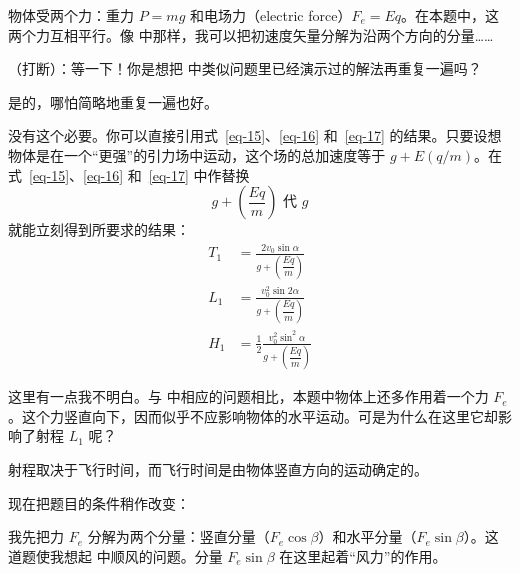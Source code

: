 \begin{dialogue}
\stdb 物体受两个力：重力 $P=mg$ 和电场力（electric force）$F_{e}=Eq$。在本题中，这两个力互相平行。像 中那样，我可以把初速度矢量分解为沿两个方向的分量……

\tchr （打断）：等一下！你是想把 中类似问题里已经演示过的解法再重复一遍吗？

\stdb 是的，哪怕简略地重复一遍也好。

\tchr 没有这个必要。你可以直接引用式~\eqref{eq-15}、\eqref{eq-16} 和~\eqref{eq-17} 的结果。只要设想物体是在一个“更强”的引力场中运动，这个场的总加速度等于 $g+E (q/m)$。在式~\eqref{eq-15}、\eqref{eq-16} 和~\eqref{eq-17} 中作替换
\begin{equation}%
 g +  \left(\frac{Eq}{m} \right) \,\, \text{代} \,\, g
\label{139}
\end{equation}
就能立刻得到所要求的结果：
\begin{align}%
T_{1} & = \frac{2 v_{0} \sin \alpha}{ g + \left(\dfrac{Eq}{m} \right)} \label{eq-140}\\
L_{1} &= \frac{ v_{0}^{2} \sin 2 \alpha}{g + \left(\dfrac{Eq}{m} \right)} \label{eq-141}\\
H_{1} &=\frac{1}{2} \frac{v_{0}^{2} \sin^{2} \alpha}{g + \left(\dfrac{Eq}{m} \right)} \label{eq-142}
\end{align}

\stda 这里有一点我不明白。与 中相应的问题相比，本题中物体上还多作用着一个力 $F_{e}$。这个力竖直向下，因而似乎不应影响物体的水平运动。可是为什么在这里它却影响了射程 $L_{1}$ 呢？

\tchr 射程取决于飞行时间，而飞行时间是由物体竖直方向的运动确定的。

现在把题目的条件稍作改变：

\stda 我先把力 $F_{e}$ 分解为两个分量：竖直分量（$F_{e} \cos \beta$）和水平分量（$F_{e} \sin \beta$）。这道题使我想起 中顺风的问题。分量 $F_{e} \sin \beta$ 在这里起着“风力”的作用。


\end{dialogue}

